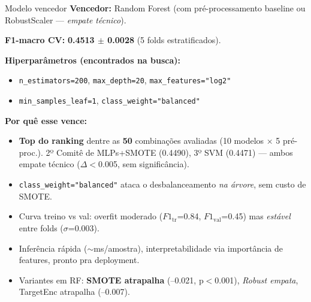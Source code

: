 \documentclass[aspectratio=169]{beamer}
\begin{document}
\begin{frame}[shrink=8]{Modelo vencedor}
\textbf{Vencedor:} \alert{Random Forest} (com pré-processamento baseline ou RobustScaler — \emph{empate técnico}).

\vspace{0.3em}
\textbf{F1-macro CV:} \textbf{0.4513 $\pm$ 0.0028} (5 folds estratificados).

\vspace{0.3em}
\textbf{Hiperparâmetros (encontrados na busca):}
\begin{itemize}\setlength{\itemsep}{0pt}
  \item \texttt{n\_estimators=200}, \texttt{max\_depth=20}, \texttt{max\_features="log2"}
  \item \texttt{min\_samples\_leaf=1}, \alert{\texttt{class\_weight="balanced"}}
\end{itemize}

\vspace{0.3em}
\textbf{Por quê esse vence:}
\begin{itemize}\setlength{\itemsep}{1pt}
  \item \textbf{Top do ranking} dentre as \textbf{50} combinações avaliadas (10 modelos × 5 pré-proc.). 2º Comitê de MLPs+SMOTE (0.4490), 3º SVM (0.4471) — ambos empate técnico ($\Delta<$0.005, sem significância).
  \item \texttt{class\_weight="balanced"} ataca o desbalanceamento \emph{na árvore}, sem custo de SMOTE.
  \item Curva treino vs val: overfit moderado ($F1_{\text{tr}}$=0.84, $F1_{\text{val}}$=0.45) mas \emph{estável} entre folds ($\sigma$=0.003).
  \item Inferência rápida ($\sim$ms/amostra), interpretabilidade via importância de features, pronto pra deployment.
  \item Variantes em RF: \textbf{SMOTE atrapalha} (--0.021, p$<$0.001), \emph{Robust empata}, TargetEnc atrapalha (--0.007).
\end{itemize}
\end{frame}
\end{document}
